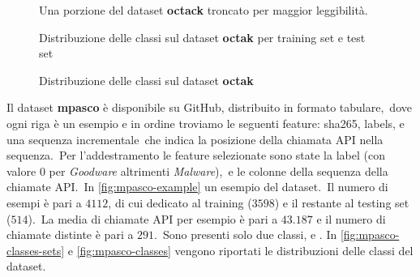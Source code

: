 \begin{figure}[htbp]
    \centering
    \begin{minipage}[t]{0.2\textwidth}
        \centering
        \inputminted[fontsize=\small]{text}{validazione-empirica/files/octak-labels.txt}
    \end{minipage}%
    \hfill
    \begin{minipage}[t]{0.75\textwidth} %
        \centering
        \inputminted[fontsize=\small]{text}{validazione-empirica/files/octak-calls.csv}
    \end{minipage}
    \caption{Una porzione del dataset \textbf{octack} troncato per maggior leggibilità.}
    \label{fig:octck-example}
\end{figure}

\begin{figure}[h!]
    \centering
    \caption{Distribuzione delle classi sul dataset \textbf{octak} per training set e test set}
    \label{fig:octak-classes-sets}
\end{figure}

\begin{figure}[h!]
    \centering
    \caption{Distribuzione delle classi sul dataset \textbf{octak}}
    \label{fig:octak-classes}
\end{figure}

\FloatBarrier


Il dataset \textbf{mpasco} è disponibile su GitHub, distribuito in formato tabulare,\
dove ogni riga è un esempio e in ordine troviamo le seguenti feature: sha265, labels, e una sequenza incrementale\
che indica la posizione della chiamata API nella sequenza.\
Per l'addestramento le feature selezionate sono state la label (con valore $0$ per \textit{Goodware} altrimenti \textit{Malware}),\
e le colonne della sequenza della chiamate API.\
In \autoref{fig:mpasco-example} un esempio del dataset.\
Il numero di esempi è pari a $4112$, di cui  dedicato al training ($3598$) e il restante  al testing set ($514$).\
La media di chiamate API per esempio è pari a $43.187$ e il numero di chiamate distinte è pari a $291$.\
Sono presenti solo due classi,  e .
In \autoref{fig:mpasco-classes-sets} e \autoref{fig:mpasco-classes} vengono riportati le distribuzioni delle classi del dataset.

